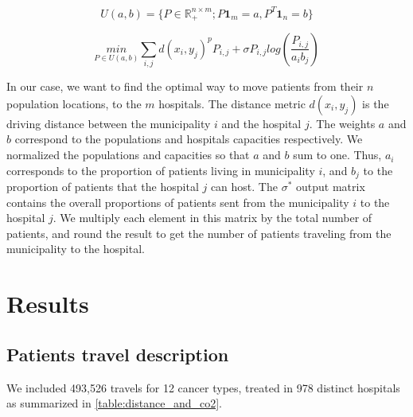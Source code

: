 \begin{equation}
    U(a, b) = \lbrace P \in \mathbb{R}_{+}^{n \times m} ; P \mathbf{1}_m = a, P^T \mathbf{1}_n = b \rbrace
    \label{eq:couplings}
\end{equation}

\begin{equation}
    \underset{P \in U(a, b)}{min} \sum_{i,j} d(x_i, y_j)^p P_{i,j} + \sigma P_{i,j} log(\frac{P_{i,j}}{a_i b_j})
    \label{eq:ot-min}
\end{equation}

In our case, we want to find the optimal way to move patients from their
$n$ population locations, to the $m$ hospitals. The distance metric
$d(x_i, y_j)$ is the driving distance between the municipality $i$ and the
hospital $j$. The weights $a$ and $b$ correspond to the populations and
hospitals capacities respectively. We normalized the populations and capacities
so that $a$ and $b$ sum to one. Thus, $a_i$ corresponds to the proportion of
patients living in municipality $i$, and $b_j$ to the proportion of patients
that the hospital $j$ can host. The $\sigma^*$ output matrix contains the
overall proportions of patients sent from the municipality $i$ to the
hospital $j$. We multiply each element in this matrix by the total number of
patients, and round the result to get the number of patients traveling from
the municipality to the hospital.

\section{Results}

\subsection{Patients travel description}

We included 493,526 travels for 12 cancer types, treated in 978 distinct
hospitals as summarized in \cref{table:distance_and_co2}.

